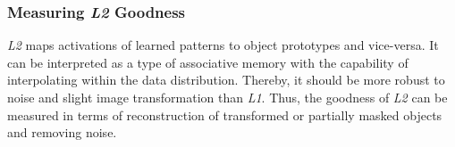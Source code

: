




\subsubsection{Measuring \emph{L2} Goodness}
\emph{L2} maps activations of learned patterns to object prototypes and vice-versa.
It can be interpreted as a type of associative memory with the capability of interpolating within the data distribution.
Thereby, it should be more robust to noise and slight image transformation than \emph{L1}.
Thus, the goodness of \emph{L2} can be measured in terms of reconstruction of transformed or partially masked objects and removing noise.


